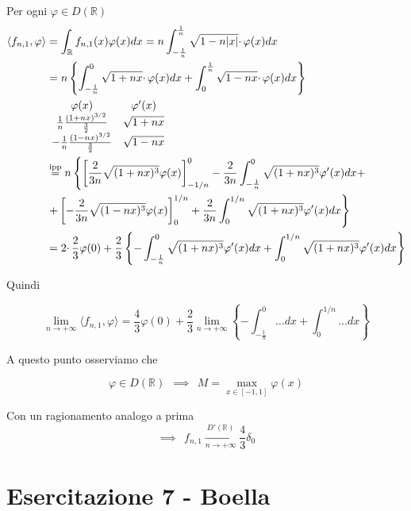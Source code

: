 \begin{enumerate}
Per ogni $\varphi \in D(\mathbb{R})$\begin{align*}
\langle f_{n,1} ,\varphi \rangle  & =\int _{\mathbb{R}} f_{n,1}( x) \varphi ( x) dx=n\int ^{\frac{1}{n}}_{-\frac{1}{n}}\sqrt{1-n| x| } \cdotp \varphi ( x) dx\\
 & =n\left\{\int ^{0}_{-\frac{1}{n}}\sqrt{1+nx} \cdotp \varphi ( x) dx+\int ^{\frac{1}{n}}_{0}\sqrt{1-nx} \cdotp \varphi ( x) dx\right\}\\
 & \begin{array}{ c c }
\varphi ( x) & \varphi '( x)\\
\frac{1}{n}\frac{( 1+nx)^{3/2}}{\frac{3}{2}} & \sqrt{1+nx}\\
-\frac{1}{n}\frac{( 1-nx)^{3/2}}{\frac{3}{2}} & \sqrt{1-nx}
\end{array}\\
 & \overset{\text{ipp}}{=} n\left\{\left[\frac{2}{3n}\sqrt{(1+nx)^{3}} \varphi (x)\right]^{0}_{-1/n} -\frac{2}{3n}\int ^{0}_{-\frac{1}{n}}\sqrt{(1+nx)^{3}} \varphi '(x)dx+\right. \\
 & \left. +\left[ -\frac{2}{3n}\sqrt{(1-nx)^{3}} \varphi (x)\right]^{1/n}_{0} +\frac{2}{3n}\int ^{1/n}_{0}\sqrt{(1+nx)^{3}} \varphi '(x)dx\right\}\\
 & =2\cdotp \frac{2}{3} \varphi ( 0) +\frac{2}{3}\left\{-\int ^{0}_{-\frac{1}{n}}\sqrt{(1+nx)^{3}} \varphi '(x)dx+\int ^{1/n}_{0}\sqrt{(1+nx)^{3}} \varphi '(x)dx\right\}
\end{align*}

Quindi

\begin{equation*}
\lim\limits _{n\rightarrow +\infty } \langle f_{n,1} ,\varphi \rangle =\frac{4}{3} \varphi ( 0) +\frac{2}{3}\lim\limits _{n\rightarrow +\infty }\left\{-\int ^{0}_{-\frac{1}{n}} \dotsc dx+\int ^{1/n}_{0} \dotsc dx\right\}
\end{equation*}

A questo punto osserviamo che

\begin{equation*}
\varphi \in D(\mathbb{R}) \ \ \implies \ \ M=\max_{x\in [ -1,1]} \varphi ( x)
\end{equation*}

Con un ragionamento analogo a prima\begin{equation*}
\implies \ \ f_{n,1}\xrightarrow[n\rightarrow +\infty ]{D'(\mathbb{R})}\frac{4}{3} \delta _{0}
\end{equation*}
\end{enumerate}
\chapter{Esercitazione 7 - Boella}
\ParteEsercizi
\Esercizio{}

